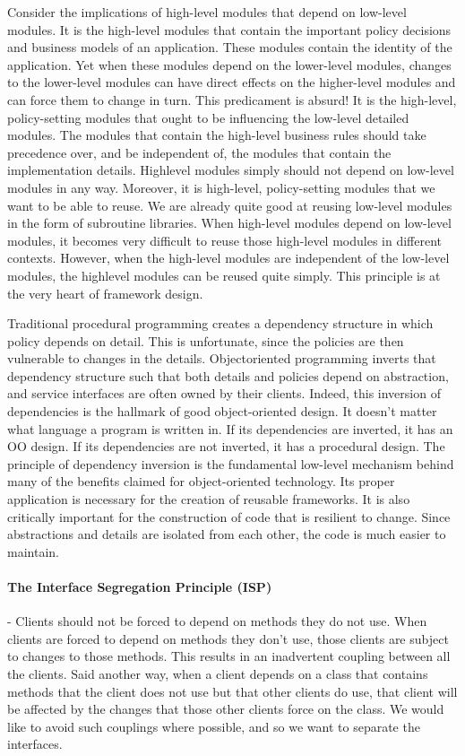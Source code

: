 \documentclass{llncs}
\begin{document}
Consider the implications of high-level modules that depend on low-level modules. 
It is the high-level modules that contain the important policy decisions and business models of an application. 
These modules contain the identity of the application. 
Yet when these modules depend on the lower-level modules, changes to the lower-level modules can have direct effects on the higher-level modules and can force them to change in turn.
This predicament is absurd! 
It is the high-level, policy-setting modules that ought to be influencing the low-level detailed modules.
The modules that contain the high-level business rules should take precedence over, and be independent of, the modules that contain the implementation details. 
Highlevel modules simply should not depend on low-level modules in any way.
Moreover, it is high-level, policy-setting modules that we want to be able to reuse.
We are already quite good at reusing low-level modules in the form of subroutine libraries.
When high-level modules depend on low-level modules, it becomes very difficult to reuse those high-level modules in different contexts. 
However, when the high-level modules are independent of the low-level modules, the highlevel modules can be reused quite simply. This principle is at the very heart of framework design.

Traditional procedural programming creates a dependency structure in which policy depends on detail.
This is unfortunate, since the policies are then vulnerable to changes in the details. 
Objectoriented programming inverts that dependency structure such that both details and policies depend on abstraction, and service interfaces are often owned by their clients.
Indeed, this inversion of dependencies is the hallmark of good object-oriented design. 
It doesn't matter what language a program is written in. 
If its dependencies are inverted, it has an OO design.
If its dependencies are not inverted, it has a procedural design.
The principle of dependency inversion is the fundamental low-level mechanism behind many of the benefits claimed for object-oriented technology.
Its proper application is necessary for the creation of reusable frameworks. 
It is also critically important for the construction of code that is resilient to change. 
Since abstractions and details are isolated from each other, the code is much easier to maintain.

\paragraph{ The Interface Segregation Principle (ISP)} - Clients should not be forced to depend on methods they do not use.
When clients are forced to depend on methods they don't use, those clients are subject to changes to those methods.
This results in an inadvertent coupling between all the clients.
Said another way, when a client depends on a class that contains methods that the client does not use but that other clients do use, that client will be affected by the changes that those other clients force on the class.
We would like to avoid such couplings where possible, and so we want to separate the interfaces.
\end{document}
